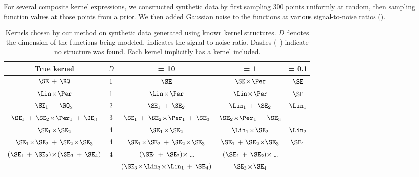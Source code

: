 For several composite kernel expressions, we constructed synthetic data by first sampling 300 points uniformly at random, then sampling function values at those points from a \gp{} prior.
We then added \iid Gaussian noise to the functions at various signal-to-noise ratios (\SNR{}).


\begin{table}[ht!]
\caption[Kernels chosen on synthetic data]
{
Kernels chosen by our method on synthetic data generated using known kernel structures. $D$ denotes the dimension of the functions being modeled.
\SNR{} indicates the signal-to-noise ratio.
Dashes (--) indicate no structure was found.
Each kernel implicitly has a \kWN{} kernel included.
}
\label{tbl:synthetic}
\addtolength{\tabcolsep}{1pt}
\setlength\extrarowheight{2pt}
\begin{center}
{\small
\begin{tabular}{c c | c c c}
True kernel & $D$ & \SNR{} = 10 & \SNR{} = 1 & \hspace{-1cm} \SNR{} = 0.1 \\
\hline
$\SE \kernplus \RQ$        & 1 & $\SE$ & $\SE \kerntimes \Per$ & $\SE$ \\
$\Lin \kerntimes \Per$ & 1 & $\Lin \kerntimes \Per$ & $\Lin \kerntimes \Per$ & $\SE$ \\
$\SE_1 \kernplus \RQ_2$    & 2 & $\SE_1 \kernplus \SE_2$ & $\Lin_1 \kernplus \SE_2$ & $\Lin_1$ \\
$\SE_1 \kernplus \SE_2 \kerntimes \Per_1 \kernplus \SE_3$ & 3 & $\SE_1 \kernplus \SE_2 \kerntimes \Per_1 \kernplus \SE_3$ & $\SE_2 \kerntimes \Per_1 \kernplus \SE_3$ & -- \\
$\SE_1 \kerntimes \SE_2$ & 4 & $\SE_1 \kerntimes \SE_2$ & $\Lin_1 \kerntimes \SE_2$ & $\Lin_2$ \\
$\SE_1 \kerntimes \SE_2 \kernplus \SE_2 \kerntimes \SE_3$ & 4 & $\SE_1 \kerntimes \SE_2 \kernplus \SE_2 \kerntimes \SE_3$ & $\SE_1 \kernplus \SE_2 \kerntimes \SE_3$ & $\SE_1$ \\
\multirow{2}{*}{ $(\SE_1 \kernplus \SE_2) \kerntimes (\SE_3 \kernplus \SE_4)$ } & \multirow{2}{*}{4} & $(\SE_1 \kernplus \SE_2) \, \kerntimes$ \dots & $(\SE_1 \kernplus \SE_2) \, \kerntimes$ \dots & \multirow{2}{*}{--} \\
 & & $(\SE_3\kerntimes\Lin_3\kerntimes\Lin_1 \kernplus \SE_4)$ & $\SE_3 \kerntimes \SE_4$ &
\end{tabular}
}
\end{center}
\end{table}


